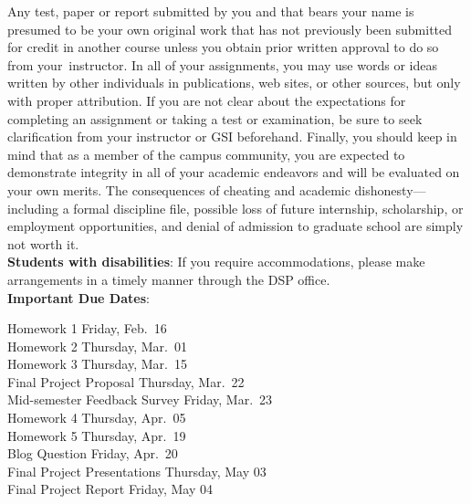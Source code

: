 \documentclass[11pt]{article}
\begin{document}
Any test, paper or report submitted by you and that bears your name is presumed
to be your own original work that has not previously been submitted for credit
in another course unless you obtain prior written approval to do so from
your instructor. In all of your assignments, you may use words or ideas written
by other individuals in publications, web sites, or other sources, but only with
proper attribution. If you are not clear about the expectations for completing
an assignment or taking a test or examination, be sure to seek clarification
from your instructor or GSI beforehand. Finally, you should keep in mind that as
a member of the campus community, you are expected to demonstrate integrity in
all of your academic endeavors and will be evaluated on your own merits. The
consequences of cheating and academic dishonesty—including a formal discipline
file, possible loss of future internship, scholarship, or employment
opportunities, and denial of admission to graduate school are simply not worth
it. \\

\textbf{Students with disabilities}: If you require accommodations, please make
arrangements in a timely manner through the DSP office.\\

\noindent\textbf{Important Due Dates}:
\begin{center} \begin{minipage}{5in}
\begin{flushleft}
Homework 1 \dotfill Friday, Feb.~16\\
Homework 2 \dotfill Thursday, Mar.~01\\
Homework 3 \dotfill Thursday, Mar.~15\\
Final Project Proposal \dotfill Thursday, Mar.~22\\
Mid-semester Feedback Survey \dotfill Friday, Mar.~23\\
Homework 4 \dotfill Thursday, Apr.~05\\
Homework 5 \dotfill Thursday, Apr.~19\\
Blog Question \dotfill Friday, Apr.~20\\
Final Project Presentations \dotfill Thursday, May 03\\
Final Project Report \dotfill Friday, May 04\\
\end{flushleft}
\end{minipage}
\end{center}

\newpage
\end{document}

